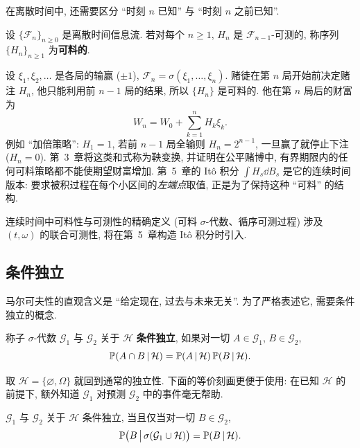 在离散时间中, 还需要区分 ``时刻 $n$ 已知'' 与 ``时刻 $n$ 之前已知''.

\begin{definition}[可料序列]\label{def:predictable}
设 $\{\mathcal{F}_n\}_{n\ge0}$ 是离散时间信息流. 若对每个 $n\ge1$, $H_n$ 是 $\mathcal{F}_{n-1}$-可测的, 称序列 $\{H_n\}_{n\ge1}$ 为\textbf{可料的}.
\end{definition}

\begin{example}[赌博策略]\label{ex:betting}
设 $\xi_1,\xi_2,\dots$ 是各局的输赢 ($\pm1$), $\mathcal{F}_n=\sigma(\xi_1,\dots,\xi_n)$. 赌徒在第 $n$ 局开始前决定赌注 $H_n$, 他只能利用前 $n-1$ 局的结果, 所以 $\{H_n\}$ 是可料的. 他在第 $n$ 局后的财富为
\[
W_n=W_0+\sum_{k=1}^nH_k\xi_k.
\]
例如 ``加倍策略'': $H_1=1$, 若前 $n-1$ 局全输则 $H_n=2^{n-1}$, 一旦赢了就停止下注 ($H_n=0$). 第~3~章将这类和式称为鞅变换, 并证明在公平赌博中, 有界期限内的任何可料策略都不能使期望财富增加. 第~5~章的 Itô 积分 $\int H_s\dd B_s$ 是它的连续时间版本: 要求被积过程在每个小区间的\emph{左端点}取值, 正是为了保持这种 ``可料'' 的结构.
\end{example}

\begin{remark}
连续时间中可料性与可测性的精确定义 (可料 $\sigma$-代数、循序可测过程) 涉及 $(t,\omega)$ 的联合可测性, 将在第~5~章构造 Itô 积分时引入.
\end{remark}

\subsection{条件独立}

马尔可夫性的直观含义是 ``给定现在, 过去与未来无关''. 为了严格表述它, 需要条件独立的概念.

\begin{definition}[条件独立]\label{def:conditional-independence}
称子 $\sigma$-代数 $\mathcal{G}_1$ 与 $\mathcal{G}_2$ 关于 $\mathcal{H}$ \textbf{条件独立}, 如果对一切 $A\in\mathcal{G}_1$, $B\in\mathcal{G}_2$,
\[
\P(A\cap B\,|\,\mathcal{H})=\P(A\,|\,\mathcal{H})\,\P(B\,|\,\mathcal{H}).
\]
\end{definition}

取 $\mathcal{H}=\{\varnothing,\Omega\}$ 就回到通常的独立性. 下面的等价刻画更便于使用: 在已知 $\mathcal{H}$ 的前提下, 额外知道 $\mathcal{G}_1$ 对预测 $\mathcal{G}_2$ 中的事件毫无帮助.

\begin{proposition}\label{prop:conditional-independence}
$\mathcal{G}_1$ 与 $\mathcal{G}_2$ 关于 $\mathcal{H}$ 条件独立, 当且仅当对一切 $B\in\mathcal{G}_2$,
\begin{equation}\label{eq:ci-equivalent}
\P\big(B\,\big|\,\sigma(\mathcal{G}_1\cup\mathcal{H})\big)=\P(B\,|\,\mathcal{H}).
\end{equation}
\end{proposition}

